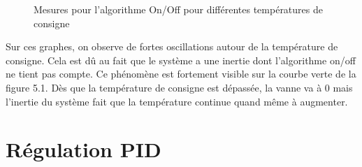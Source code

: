\documentclass[12pt]{report}
\begin{document}
\begin{center}
\begin{figure}[H]
    \begin{minipage}[t]{8cm}
        \centering
    \end{minipage}\hfill
    \begin{minipage}[t]{8cm}
        \centering
    \end{minipage}
    \caption{\label{onoff} Mesures pour l'algorithme On/Off pour différentes températures de consigne}
\end{figure}
\end{center}

Sur ces graphes, on observe de fortes oscillations autour de la température de consigne. Cela est dû au fait que le syst\`{e}me a une inertie dont l'algorithme on/off ne tient pas compte. Ce phénomène est fortement visible sur la courbe verte de la figure 5.1. Dès que la température de consigne est dépassée, la vanne va à 0 mais l'inertie du système fait que la température continue quand même à augmenter.


\section{Régulation PID}
\end{document}
